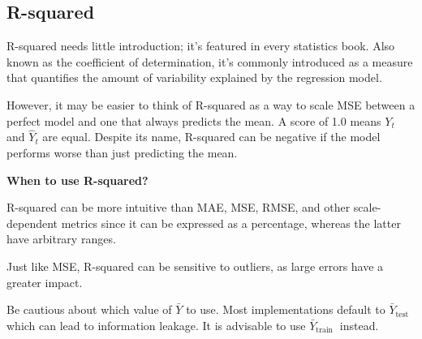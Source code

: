 \subsection{R-squared}

R-squared needs little introduction; it's featured in every statistics book. Also known as the coefficient of determination, it's commonly introduced as a measure that quantifies the amount of variability explained by the regression model.

\begin{center}
\end{center}

However, it may be easier to think of R-squared as a way to scale MSE between a perfect model and one that always predicts the mean. A score of 1.0 means $Y_t$ and $\hat{Y}_t$ are equal. Despite its name, R-squared can be negative if the model performs worse than just predicting the mean.

\textbf{When to use R-squared?}

R-squared can be more intuitive than MAE, MSE, RMSE, and other scale-dependent metrics since it can be expressed as a percentage, whereas the latter have arbitrary ranges.

{
    \item Just like MSE, R-squared can be sensitive to outliers, as large errors have a greater impact.
    \item Be cautious about which value of $\bar{Y}$ to use. Most implementations default to $\bar{Y}_{\text {test }}$ which can lead to information leakage. It is advisable to use $\bar{Y}_{\text {train }}$ instead.
}


